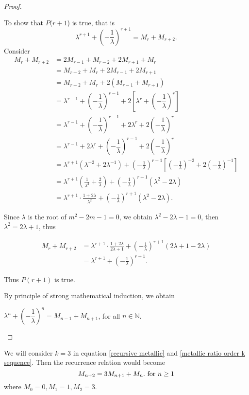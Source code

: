 \documentclass{rmutt-seminar}
\begin{document}
\begin{proof}
\begin{enumerate}[label=(\roman*),leftmargin = 1.5cm]
To show that $P(r+1$) is true, that is
$$ \lambda^{r+1} + \left(-\dfrac{1}{\lambda}\right)^{r+1}= M_{r} + M_{r+2}. $$  
 Consider
 \begin{align*}
	M_{r} + M_{r+2} &= 2M_{r-1} + M_{r-2} + 2M_{r+1} + M_r \\
	&= M_{r-2} + M_r + 2M_{r-1} + 2M_{r+1} \\
	&= M_{r-2} + M_r + 2(M_{r-1} + M_{r+1}) \\
	&= \lambda^{r-1} + \left(-\dfrac{1}{\lambda}\right)^{r-1} +2\left[\lambda^{r} + \left(-\dfrac{1}{\lambda}\right)^{r} \right]\\
	&= \lambda^{r-1} + \left(-\dfrac{1}{\lambda}\right)^{r-1} +2\lambda^{r} + 2\left(-\dfrac{1}{\lambda}\right)^{r} \\
	&= \lambda^{r-1} + 2\lambda^{r} + \left(-\dfrac{1}{\lambda}\right)^{r-1} + 2\left(-\dfrac{1}{\lambda}\right)^{r} \\
	&= \lambda^{r+1}(\lambda^{-2} + 2\lambda^{-1}) + \left(-\frac{1}{\lambda}\right)^{r+1} \left[ \left(-\frac{1}{\lambda}\right)^{-2} + 2\left(-\frac{1}{\lambda}\right)^{-1}\right] \\
	&= \lambda^{r+1} \left(\frac{1}{\lambda^2} + \frac{2}{\lambda}\right) + \left(-\frac{1}{\lambda}\right)^{r+1}(\lambda^2-2\lambda) \\
	&= \lambda^{r+1} \cdot \frac{1+2\lambda}{\lambda^2}+\left(-\frac{1}{\lambda}\right)^{r+1}(\lambda^2-2\lambda).
\end{align*}

Since $\lambda$ is the root of $m^2 -2m -1 =0$, we obtain $\lambda^2-2\lambda-1=0$, then $\lambda^2 = 2\lambda + 1$, thus

 \begin{align*}
 M_{r} + M_{r+2} &= \lambda^{r+1} \cdot \frac{1+2\lambda}{2\lambda+1}+\left(-\frac{1}{\lambda}\right)^{r+1}(2\lambda+1-2\lambda)\\
 &= \lambda^{r+1}+\left(-\frac{1}{\lambda}\right)^{r+1}.
 \end{align*}	
 
 
 Thus $P(r+1)$ is true.

By principle of strong mathematical induction, we obtain

\begin{center}
$\lambda^n + \left(-\dfrac{1}{\lambda}\right)^n = M_{n-1} + M_{n+1} $, for all $n \in \mathbb{N}$.
\end{center}
\end{enumerate}
\end{proof}
\noindent We will consider $ k = 3 $ in equation \eqref{recursive metallic} and \eqref{metallic ratio order k sequence}. Then the recurrence relation would become 
\begin{equation}\label{k = 3 in reccurence}
	 M_{n+2} = 3M_{n+1} + M_n.
	 \textnormal{ for } n \geq 1
\end{equation}  
where $M_0=0, M_1=1, M_2=3.$
\newline
\end{document}
